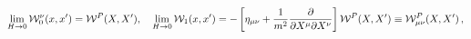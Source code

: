 \begin{equation}
\lim_{H\rightarrow 0}{\cal W}^{\nu}_{0}(x,x')={\cal
W}^{P}(X,X'),\quad\lim_{H\rightarrow 0}{\cal
W}_{1}(x,x')=-\left[\eta_{\mu\nu}+\frac{1}{m^{2}}
\frac{\partial}{\partial X^{\mu}\partial X^{\nu}}\right] {\cal
W}^{P}(X,X')\equiv{\cal W}_{\mu\nu}^{P}(X,X')\,,
\end{equation}

